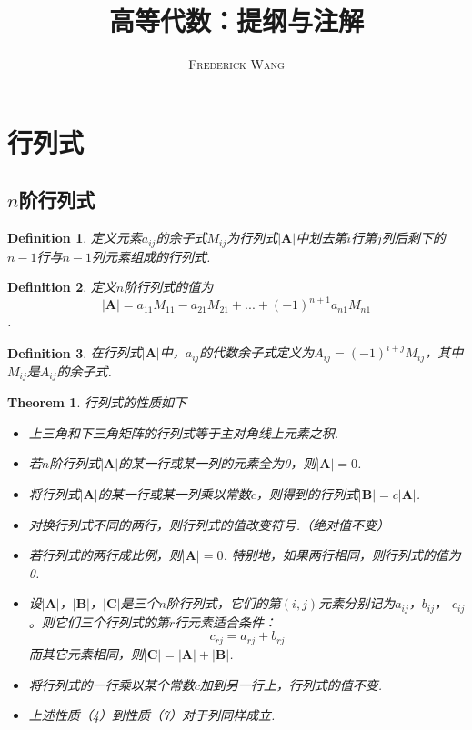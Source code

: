 \documentclass[9pt]{ctexart}
\title{\bf{高等代数：提纲与注解}}
\author{\textsc{Frederick Wang}}
\date{}
\newtheorem{definition}{Definition}[section]
\newtheorem{theorem}{Theorem}[section]
\begin{document}
\maketitle
\section{行列式}
\subsection{$n$阶行列式}
\begin{definition}
    定义元素$a_{ij}$的余子式$M_{ij}$为行列式$|\bm{A}|$中划去第$i$行第$j$列后剩下的$n-1$行与$n-1$列元素组成的行列式.
\end{definition}
\begin{definition}
    定义$n$阶行列式的值为
    \[|\bm{A}|=a_{11}M_{11}-a_{21}M_{21}+...+(-1)^{n+1}a_{n1}M_{n1}\].
\end{definition}
\begin{definition}
    在行列式$|\bm{A}|$中，$a_{ij}$的代数余子式定义为$A_{ij}=(-1)^{i+j}M_{ij}$，其中$M_{ij}$是$A_{ij}$的余子式.
\end{definition}
\begin{theorem}
    行列式的性质如下
    \begin{itemize}
        \item[（1）] 上三角和下三角矩阵的行列式等于主对角线上元素之积.
        \item[（2）] 若$n$阶行列式$|\bm{A}|$的某一行或某一列的元素全为0，则$|\bm{A}|=0$.
        \item[（3）] 将行列式$|\bm{A}|$的某一行或某一列乘以常数$c$，则得到的行列式$|\bm{B}|=c|\bm{A}|$.
        \item[（4）] 对换行列式不同的两行，则行列式的值改变符号.（绝对值不变）
        \item[（5）] 若行列式的两行成比例，则$|\bm{A}|=0$. 特别地，如果两行相同，则行列式的值为0.
        \item[（6）] 设$|\bm{A}|$，$|\bm{B}|$，$|\bm{C}|$是三个$n$阶行列式，它们的第$(i,j)$元素分别记为$a_{ij}$，$b_{ij}$， $c_{ij}$。则它们三个行列式的第$r$行元素适合条件：\[c_{rj}=a_{rj}+b_{rj}\]而其它元素相同，则$|\bm{C}|=|\bm{A}|+|\bm{B}|$.
        \item[（7）] 将行列式的一行乘以某个常数$c$加到另一行上，行列式的值不变.
        \item[*]上述性质（4）到性质（7）对于列同样成立.
    \end{itemize}
\end{theorem}
\end{document}
